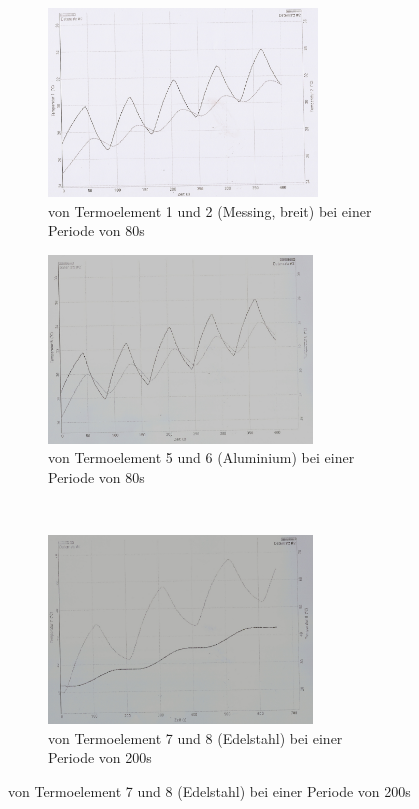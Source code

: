 \begin{figure}
  \centering
  \caption{Temperaturverläufe im dynamischen Fall}
  \begin{subfigure}{0.48\textwidth}
    \centering
    \includegraphics[height= 5cm, width = \textwidth]{logos/pT1.jpg}
    \caption{von Termoelement 1 und 2 (Messing, breit) bei einer Periode von 80s}
    \label{fig:pT12}
  \end{subfigure}
  \begin{subfigure}{0.48\textwidth}
    \centering
    \includegraphics[height = 5cm , width = \textwidth]{logos/p40sT5.jpg}
    \caption{von Termoelement 5 und 6 (Aluminium) bei einer Periode von 80s}
    \label{fig:pT56}
  \end{subfigure}
  \\
  \begin{subfigure}{0.48\textwidth}
    \centering
    \includegraphics[height=5cm, width= \textwidth]{logos/pT7.jpg}
    \caption{von Termoelement 7 und 8 (Edelstahl) bei einer Periode von 200s}
    \label{fig:pT78}
  \end{subfigure}
  \label{fig:dfall}
\end{figure}
